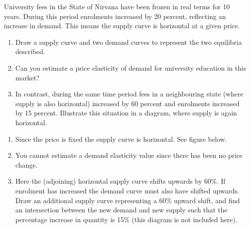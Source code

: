 \begin{enumialphparenastyle}
\begin{econex}\label{ex:ch4ex3}
University fees in the State of Nirvana have been frozen in real terms for 10 years. During this period enrolments increased by 20 percent, reflecting an increase in demand. This means the supply curve is horizontal at a given price.
\begin{enumerate}
\item	Draw a supply curve and two demand curves to represent the two equilibria described. 
\item	Can you estimate a price elasticity of demand for university education in this market?
\item	In contrast, during the same time period fees in a neighbouring state (where supply is also horizontal) increased by 60 percent and enrolments increased by 15 percent. Illustrate this situation in a diagram, where supply is again horizontal.
\end{enumerate}
\begin{econsolution}
\begin{enumerate}
\item	Since the price is fixed the supply curve is horizontal. See figure below.
\item	You cannot estimate a demand elasticity value since there has been no price change.
\item	Here the (adjoining) horizontal supply curve shifts upwards by 60\%. If enrolment has increased the demand curve must also have shifted upwards. Draw an additional supply curve representing a 60\% upward shift, and find an intersection between the new demand and new supply such that the percentage increase in quantity is 15\% (this diagram is not included here).
\end{enumerate}
\begin{center*}
\end{center*}
\end{econsolution}
\end{econex}


\end{enumialphparenastyle}
